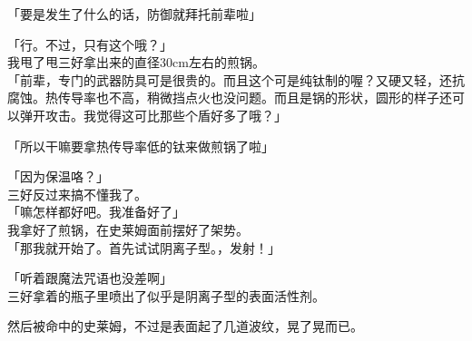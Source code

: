 「要是发生了什么的话，防御就拜托前辈啦」

「行。不过，只有这个哦？」\\

我甩了甩三好拿出来的直径30cm左右的煎锅。\\

「前辈，专门的武器防具可是很贵的。而且这个可是纯钛制的喔？又硬又轻，还抗腐蚀。热传导率也不高，稍微挡点火也没问题。而且是锅的形状，圆形的样子还可以弹开攻击。我觉得这可比那些个盾好多了哦？」

「所以干嘛要拿热传导率低的钛来做煎锅了啦」

「因为保温咯？」\\

三好反过来搞不懂我了。\\

「嘛怎样都好吧。我准备好了」\\

我拿好了煎锅，在史莱姆面前摆好了架势。\\

「那我就开始了。首先试试阴离子型。，发射！」

「听着跟魔法咒语也没差啊」\\

三好拿着的瓶子里喷出了似乎是阴离子型的表面活性剂。

然后被命中的史莱姆，不过是表面起了几道波纹，晃了晃而已。\\

